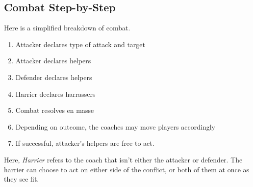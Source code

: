 \subsection{Combat Step-by-Step}\label{combat-step-by-step}
Here is a simplified breakdown of combat.
\begin{enumerate}
    \item Attacker declares type of attack and target
    \item Attacker declares helpers
    \item Defender declares helpers
    \item Harrier declares harrassers
    \item Combat resolves en masse
    \item Depending on outcome, the coaches may move players accordingly
    \item If successful, attacker's helpers are free to act.
\end{enumerate}

\begin{note}
Here, \textit{Harrier} refers to the coach that isn't either the attacker or defender. 
The harrier can choose to act on either side of the conflict, or both of them at once as they see fit.
\end{note}